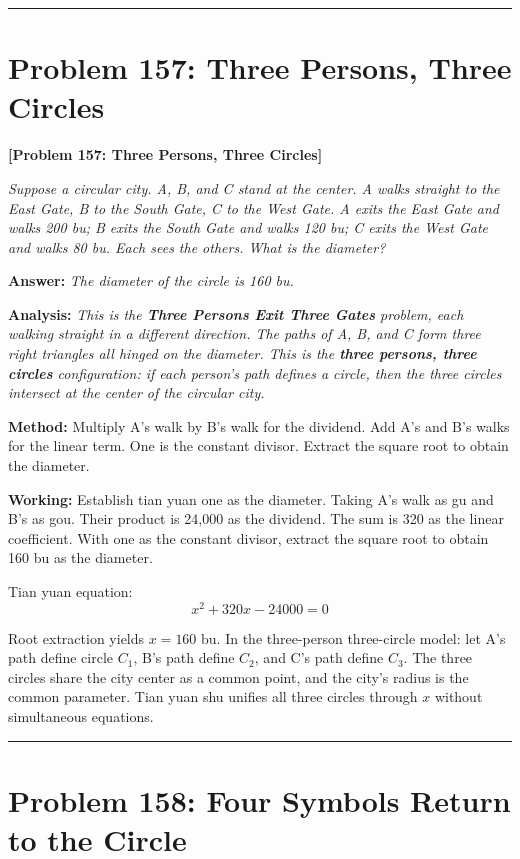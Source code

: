 \documentclass[11pt,a4paper]{book}
\newcommand{\answer}[1]{\noindent\textbf{\color{anacolor}Answer: }\textit{#1}\par}
\newcommand{\method}[1]{\noindent\textbf{\color{methodcolor}Method: }#1\par}
\newcommand{\working}[1]{\noindent\textbf{\color{workcolor}Working: }#1\par}
\newcommand{\analysis}[1]{\noindent\textbf{\color{anacolor}Analysis: }\textit{#1}\par}
\newcommand{\shortline}{\noindent\rule{0.5\textwidth}{0.4pt}\par}
\begin{document}
\shortline

\section{Problem 157: Three Persons, Three Circles}
\label{sec:prob157}

\noindent\textbf{\color{probcolor}[Problem 157: Three Persons, Three Circles]}

\textit{Suppose a circular city. A, B, and C stand at the center. A walks straight to the East Gate, B to the South Gate, C to the West Gate. A exits the East Gate and walks 200 bu; B exits the South Gate and walks 120 bu; C exits the West Gate and walks 80 bu. Each sees the others. What is the diameter?}

\answer{The diameter of the circle is 160 bu.}

\analysis{This is the \textbf{Three Persons Exit Three Gates} problem, each walking straight in a different direction. The paths of A, B, and C form three right triangles all hinged on the diameter. This is the \textbf{three persons, three circles} configuration: if each person's path defines a circle, then the three circles intersect at the center of the circular city.}

\method{Multiply A's walk by B's walk for the dividend. Add A's and B's walks for the linear term. One is the constant divisor. Extract the square root to obtain the diameter.}

\working{Establish tian yuan one as the diameter. Taking A's walk as gu and B's as gou. Their product is 24,000 as the dividend. The sum is 320 as the linear coefficient. With one as the constant divisor, extract the square root to obtain 160 bu as the diameter.

Tian yuan equation:
$$x^2 + 320x - 24000 = 0$$

Root extraction yields $x = 160$ bu. In the three-person three-circle model: let A's path define circle $C_1$, B's path define $C_2$, and C's path define $C_3$. The three circles share the city center as a common point, and the city's radius is the common parameter. Tian yuan shu unifies all three circles through $x$ without simultaneous equations.}

\shortline

\section{Problem 158: Four Symbols Return to the Circle}
\label{sec:prob158}
\end{document}
